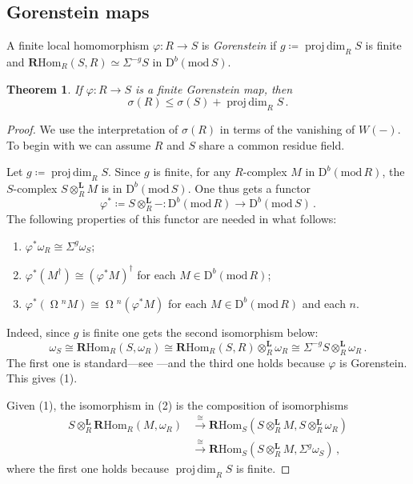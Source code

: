 \documentclass{amsart}
\numberwithin{equation}{section}
\theoremstyle{plain}
\newtheorem{theorem}[equation]{Theorem}
\theoremstyle{definition}
\theoremstyle{remark}
\newcommand{\dbcat}[1]{\mathrm{D}^b(\mathrm{mod}\,{#1})}
\newcommand{\lotimes}{\otimes^{\mathbf L}}
\newcommand{\projdim}{\operatorname{proj\,dim}}
\newcommand{\rhom}{\mathbf{R}\mathrm{Hom}}
\newcommand{\syz}{\operatorname{\Omega}\!}
\begin{document}
\subsection*{Gorenstein maps}
A finite local homomorphism $\varphi\colon R\to S$ is \emph{Gorenstein} if $g\coloneqq \projdim_RS$ is finite and $\rhom_R(S,R)\simeq \Sigma^{-g} S$ in $\dbcat S$.

\begin{theorem}
\label{th:gor-map}
If $\varphi\colon R\to S$ is a finite Gorenstein map, then 
\[
\sigma(R)\le \sigma(S)+\projdim_RS\,.
\]
\end{theorem}

\begin{proof}
We use the interpretation of $\sigma(R)$ in terms of the vanishing of $W(-)$. To begin with we can assume $R$ and $S$ share a common residue field. 

Let $g\coloneqq \projdim_RS$. Since $g$ is finite, for any $R$-complex $M$ in $\dbcat R$, the $S$-complex  $S\lotimes_R M$ is in $\dbcat S$. One thus gets a functor 
\[
\varphi^*\coloneqq S\lotimes_R-\colon \dbcat R\longrightarrow \dbcat S\,.
\]
The following properties of this functor are needed in what follows:
\begin{enumerate}[\quad\rm(1)]
    \item
    $\varphi^*\omega_R \cong \Sigma^g \omega_S$;
    \item
    $\varphi^*(M^\dagger) \cong (\varphi^*M)^\dagger$ for each $M\in\dbcat R$;
    \item 
    $\varphi^*(\syz^nM)\cong \syz^{n}(\varphi^*M)$ for each $M\in \dbcat R$ and each $n$.
\end{enumerate}

Indeed, since $g$ is finite one gets the second isomorphism below:
\[
\omega_S\cong \rhom_R(S,\omega_R)\cong \rhom_R(S,R)\lotimes_R\omega_R \cong \Sigma^{-g} S\lotimes_R\omega_R\,.
\]
The first one is standard---see \cite[\href{https://stacks.math.columbia.edu/tag/0AX0}{Tag 0AX0}]{stacks-project}---and the third one holds because $\varphi$ is Gorenstein. This gives (1).

Given (1), the isomorphism in (2) is the composition of isomorphisms
\begin{align*}
S\lotimes_R \rhom_R(M,\omega_R) &\xrightarrow{\ \cong\ } 
        \rhom_S(S\lotimes_R M,S\lotimes_R\omega_R) \\
        &\xrightarrow{\ \cong\ } \rhom_S(S\lotimes_R M, \Sigma^g \omega_S)\,,       
\end{align*}
where the first one holds because $\projdim_RS$ is finite.


\end{proof}
\end{document}
